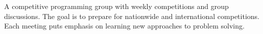 \begin{resume}

  \begin{position}
    A competitive programming group with weekly competitions and group discussions. The goal is to prepare for nationwide and international competitions. Each meeting puts emphasis on learning new approaches to problem solving.
  \end{position}


\end{resume}
